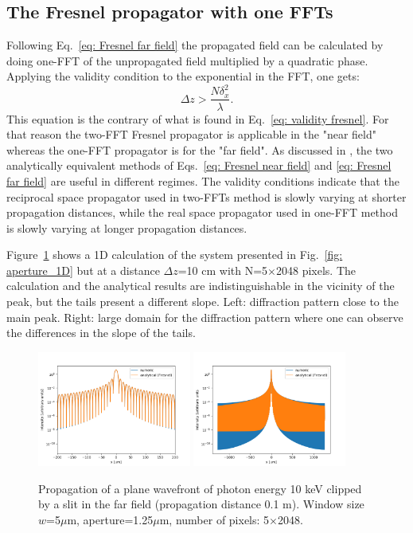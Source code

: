 \documentclass{iucr}              %
\begin{document}
\subsection{The Fresnel propagator with one FFTs}

Following Eq.~\ref{eq: Fresnel far field} the propagated field can be calculated by doing one-FFT of the unpropagated field multiplied by a quadratic phase. 
Applying the validity condition to the exponential in the FFT, one gets: 
\begin{equation}\label{fig: validity fresnel far}
    \Delta z > \frac{N \delta_x^2}{\lambda}.
\end{equation}
This equation is the contrary of what is found in Eq.~\ref{eq: validity fresnel}. For that reason the two-FFT Fresnel propagator is applicable in the "near field" whereas the one-FFT propagator is for the "far field". As discussed in \cite{Li}, the two analytically equivalent methods of Eqs.~\ref{eq: Fresnel near field} and \ref{eq: Fresnel far field} are useful in different regimes. The validity conditions indicate that the reciprocal space propagator used in two-FFTs method is slowly varying at shorter propagation distances, while the real space propagator used in one-FFT method is slowly varying at longer propagation distances.

Figure~\ref{fig: far_field} shows a 1D calculation of the system presented in Fig.~\ref{fig: aperture_1D} but at a distance $\Delta z$=10 cm with N=5$\times$2048 pixels. The calculation and the analytical results are indistinguishable in the vicinity of the peak, but the tails present a different slope. Left: diffraction pattern close to the main peak. Right: large domain for the diffraction pattern where one can observe the differences in the slope of the tails.

\begin{figure}\label{fig: far_field}
    \centering
    \includegraphics[width=0.45\textwidth]{far_field_a.png}
    \includegraphics[width=0.45\textwidth]{far_field_b.png}
    \caption{Propagation of a plane wavefront of photon energy 10 keV clipped by a slit in the far field (propagation distance 0.1 m). Window size $w$=5$\mu$m, aperture=1.25$\mu$m, number of pixels: 5$\times$2048. }
\end{figure}
\end{document}

